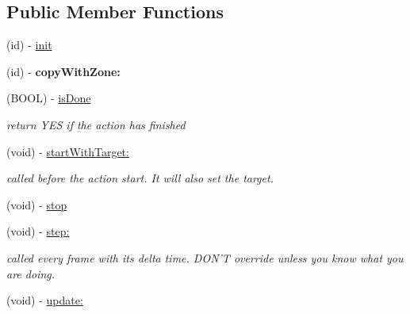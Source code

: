 \subsection*{Public Member Functions}
\begin{DoxyCompactItemize}
\item 
(id) -\/ \hyperlink{interface_c_c_action_a9388e3a5788c4a4bb076549571c37fe9}{init}
\item 
\hypertarget{interface_c_c_action_a178ffeaeca1469177f0ff7b6a9e24350}{(id) -\/ {\bfseries copy\-With\-Zone\-:}}\label{interface_c_c_action_a178ffeaeca1469177f0ff7b6a9e24350}

\item 
\hypertarget{interface_c_c_action_a22021b72225f153c351e442c9202965a}{(B\-O\-O\-L) -\/ \hyperlink{interface_c_c_action_a22021b72225f153c351e442c9202965a}{is\-Done}}\label{interface_c_c_action_a22021b72225f153c351e442c9202965a}

\begin{DoxyCompactList}\small\item\em return Y\-E\-S if the action has finished \end{DoxyCompactList}\item 
\hypertarget{interface_c_c_action_a791b44f936b12d01e2aab5df8af41bfb}{(void) -\/ \hyperlink{interface_c_c_action_a791b44f936b12d01e2aab5df8af41bfb}{start\-With\-Target\-:}}\label{interface_c_c_action_a791b44f936b12d01e2aab5df8af41bfb}

\begin{DoxyCompactList}\small\item\em called before the action start. It will also set the target. \end{DoxyCompactList}\item 
(void) -\/ \hyperlink{interface_c_c_action_aef4e1ef2a9c8072dbe92c927ccac83c4}{stop}
\item 
\hypertarget{interface_c_c_action_aa5b99a235d7eab4f2ff29ca7bca5054e}{(void) -\/ \hyperlink{interface_c_c_action_aa5b99a235d7eab4f2ff29ca7bca5054e}{step\-:}}\label{interface_c_c_action_aa5b99a235d7eab4f2ff29ca7bca5054e}

\begin{DoxyCompactList}\small\item\em called every frame with its delta time. D\-O\-N'T override unless you know what you are doing. \end{DoxyCompactList}\item 
(void) -\/ \hyperlink{interface_c_c_action_a41207f5e0f31713136c8b690fcf166ef}{update\-:}
\end{DoxyCompactItemize}
